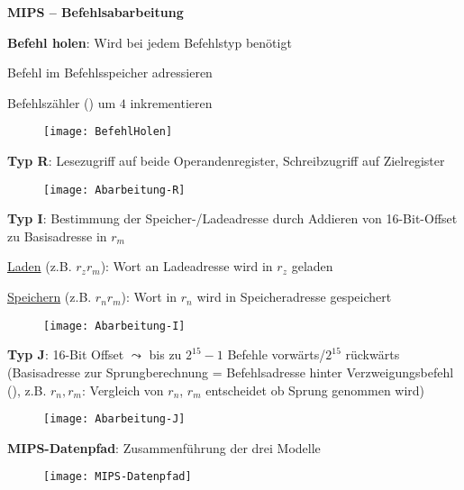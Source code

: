\textbf{MIPS  -- Befehlsabarbeitung}
\begin{items}
  \item \textbf{Befehl holen}: Wird bei jedem Befehlstyp benötigt
  \begin{enumeration}
    \item Befehl im Befehlsspeicher adressieren
    \item Befehlszähler () um \( 4 \) inkrementieren
  \end{enumeration}
  \begin{figure}[H]\centering\label{BefehlHolen}\texttt{[image: BefehlHolen]}\end{figure}

  \item \textbf{Typ R}: Lesezugriff auf beide Operandenregister, Schreibzugriff auf Zielregister
  \begin{figure}[H]\centering\label{Abarbeitung-R}\texttt{[image: Abarbeitung-R]}\end{figure}

  \item \textbf{Typ I}: Bestimmung der Speicher-/Ladeadresse durch Addieren von 16-Bit-Offset zu Basisadresse in \( r_m \)
  \begin{enumeration}
    \item \underline{Laden} (z.B.  \( r_z \)\( r_m \)\code{)}): Wort an Ladeadresse wird in \( r_z \) geladen
    \item \underline{Speichern} (z.B.  \( r_n \)\( r_m \)\code{)}): Wort in \( r_n \) wird in Speicheradresse gespeichert
  \end{enumeration}
  \begin{figure}[H]\centering\label{Abarbeitung-I}\texttt{[image: Abarbeitung-I]}\end{figure}

  \item \textbf{Typ J}: 16-Bit Offset \( \leadsto \) bis zu \( 2^{15}-1 \) Befehle vorwärts/\( 2^{15} \) rückwärts (Basisadresse zur Sprungberechnung = Befehlsadresse hinter Verzweigungsbefehl (), z.B.  \( r_n, r_m \): Vergleich von \( r_n \), \( r_m \) entscheidet ob Sprung genommen wird)
  \begin{figure}[H]\centering\label{Abarbeitung-J}\texttt{[image: Abarbeitung-J]}\end{figure}

  \newpage

  \item \textbf{MIPS-Datenpfad}: Zusammenführung der drei Modelle
  \begin{figure}[H]\centering\label{MIPS-Datenpfad}\texttt{[image: MIPS-Datenpfad]}\end{figure}
\end{items}